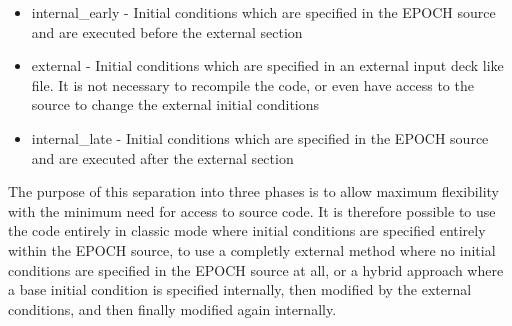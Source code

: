 \documentclass[12pt]{article}
\begin{document}
\begin{itemize}
\item internal\_early - Initial conditions which are specified in the EPOCH source and are executed before the external section
\item external - Initial conditions which are specified in an external input deck like file. It is not necessary to recompile the code, or even have access to the source to change the external initial conditions
\item internal\_late - Initial conditions which are specified in the EPOCH source and are executed after the external section
\end{itemize}
The purpose of this separation into three phases is to allow maximum flexibility with the minimum need for access to source code. It is therefore possible to use the code entirely in classic mode where initial conditions are specified entirely within the EPOCH source, to use a completly external method where no initial conditions are specified in the EPOCH source at all, or a hybrid approach where a base initial condition is specified internally, then modified by the external conditions, and then finally modified again internally.
\end{document}
